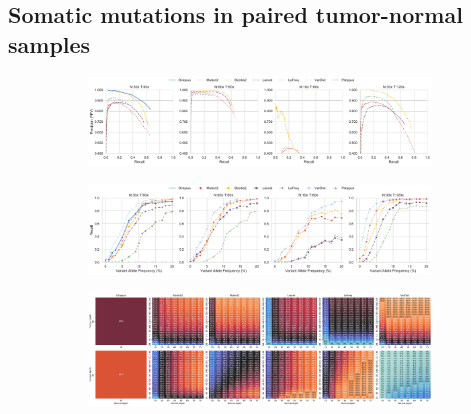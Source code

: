 \documentclass[notitlepage, twocolumn, 10pt]{article}
\begin{document}
\subsection*{Somatic mutations in paired tumor-normal samples}

\begin{figure}[ht!]
    \centering
\captionsetup[subfigure]{position=top,labelfont=bf,textfont=normalfont,singlelinecheck=off,justification=raggedright}
    \begin{subfigure}[b]{\textwidth}
        \vspace{-0.5cm}
        \caption{}
        \includegraphics[width=\textwidth]{figures/BRCA_precision_recalls}
        \label{fig:paired-somatic-precision-recall}
    \end{subfigure}
    \begin{subfigure}[b]{\textwidth}
        \vspace{-1cm}
        \caption{}
        \includegraphics[width=\textwidth]{figures/BRCA_VAF_recalls}
        \label{fig:paired-somatic-precision-recall}
    \end{subfigure}
    \begin{subfigure}[b]{\textwidth}
        \vspace{-1.0cm}
        \caption{}
        \includegraphics[width=\textwidth]{figures/BRCA_heatmaps}
        \label{fig:paired-somatic-vaf-recall}

\end{subfigure}
\end{figure}
\end{document}
